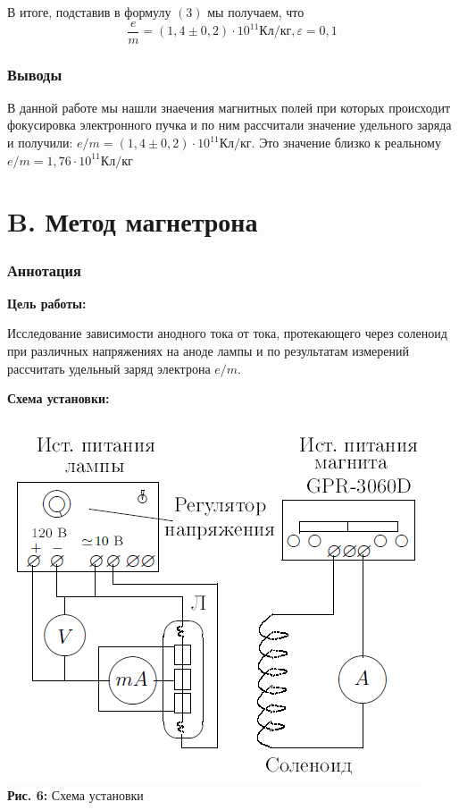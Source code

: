 \documentclass[12pt,a4paper]{scrartcl}
\begin{document}
 В итоге, подставив в формулу $(3)$ мы получаем, что 
\[\dfrac{e}{m} = \left(1,4 \pm 0,2\right) \cdot 10^{11} \text{Кл}/\text{кг}, \varepsilon = 0,1\]  
  
\section{Выводы}  
  
В данной работе мы нашли знаечения магнитных полей при которых происходит фокусировка электронного пучка и по ним рассчитали значение удельного заряда и получили: $e/m = (1,4 \pm 0,2) \cdot 10^{11} \text{Кл}/\text{кг}$. Это значение  близко к реальному $e/m = 1,76 \cdot 10^{11} \text{Кл}/\text{кг}$

	\part*{B. Метод магнетрона}	
	\setcounter{section}{0}
	\section{Аннотация}
	
		\textbf{Цель работы: }
	
Исследование зависимости анодного тока от тока, протекающего через соленоид при различных напряжениях на аноде лампы и по результатам измерений рассчитать удельный заряд электрона $e/m$.	
	
	\textbf{Схема установки:}
	\begin{center}
		\includegraphics[scale=0.7]{PIC_6.png}
		\\\textbf{Рис. 6:} Схема установки
	\end{center}
	
\end{document}
